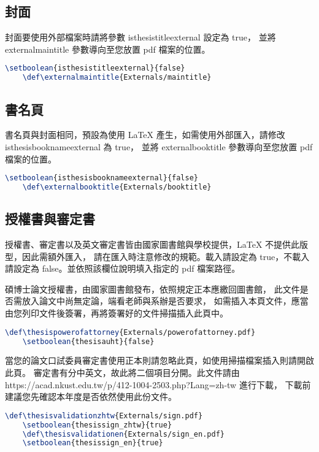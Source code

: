 \subsection*{封面}

封面要使用外部檔案時請將參數 isthesistitleexternal 設定為 true，
並將 externalmaintitle 參數導向至您放置 pdf 檔案的位置。

\begin{lstlisting}[language=TeX]
    \setboolean{isthesistitleexternal}{false}
    \def\externalmaintitle{Externals/maintitle}
\end{lstlisting}

\subsection*{書名頁}
書名頁與封面相同，預設為使用 LaTeX 產生，如需使用外部匯入，請修改 isthesisbooknameexternal 為 true，
並將 externalbooktitle 參數導向至您放置 pdf 檔案的位置。

\begin{lstlisting}[language=TeX]
    \setboolean{isthesisbooknameexternal}{false}
    \def\externalbooktitle{Externals/booktitle}
\end{lstlisting}

\subsection*{授權書與審定書}

授權書、審定書以及英文審定書皆由國家圖書館與學校提供，LaTeX 不提供此版型，因此需額外匯入，
請在匯入時注意修改的規範。載入請設定為 true，不載入請設定為 false。並依照該欄位說明填入指定的 pdf 檔案路徑。

碩博士論文授權書，由國家圖書館發布，依照規定正本應繳回圖書館，
此文件是否需放入論文中尚無定論，端看老師與系辦是否要求，
如需插入本頁文件，應當由您列印文件後簽署，再將簽署好的文件掃描插入此頁中。
\begin{lstlisting}[language=TeX]
    \def\thesispowerofattorney{Externals/powerofattorney.pdf}
    \setboolean{thesisauht}{false}
\end{lstlisting}

當您的論文口試委員審定書使用正本則請忽略此頁，如使用掃描檔案插入則請開啟此頁。
審定書有分中英文，故此將二個項目分開。此文件請由 https://acad.nkust.edu.tw/p/412-1004-2503.php?Lang=zh-tw 進行下載，
下載前建議您先確認本年度是否依然使用此份文件。

\begin{lstlisting}[language=TeX]
    \def\thesisvalidationzhtw{Externals/sign.pdf}
    \setboolean{thesissign_zhtw}{true}
    \def\thesisvalidationen{Externals/sign_en.pdf}
    \setboolean{thesissign_en}{true}
\end{lstlisting}

